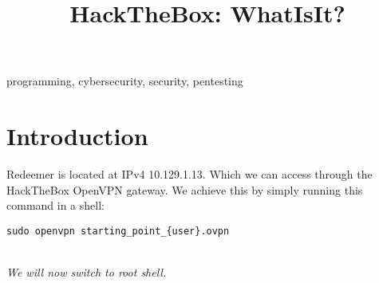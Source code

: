 \documentclass[conference]{IEEEtran}
\begin{document}
\onecolumn


\title{HackTheBox: WhatIsIt?}

\author{
}

\maketitle



\begin{abstract}

\end{abstract}



\begin{IEEEkeywords}
programming, cybersecurity, security, pentesting
\end{IEEEkeywords}


\section{Introduction}
Redeemer is located at IPv4 10.129.1.13. Which we can access through the HackTheBox OpenVPN gateway.
We achieve this by simply running this command in a shell:
\begin{scriptsize}
\begin{verbatim}
sudo openvpn starting_point_{user}.ovpn
\end{verbatim}
\end{scriptsize}

\\
\textit{We will now switch to root shell.}
\\
\end{document}
